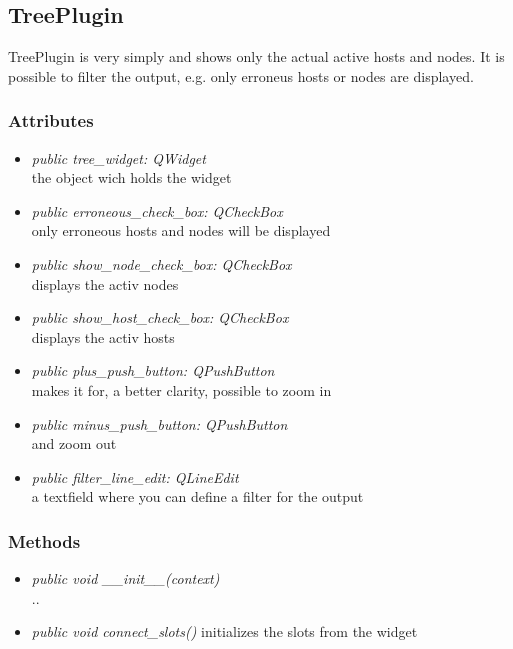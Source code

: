 \subsection{TreePlugin}
TreePlugin is very simply and shows only the actual active hosts
and nodes. It is possible to filter the output, e.g. only erroneus hosts or
nodes are displayed.
\subsubsection{Attributes}
\begin{itemize}
  \item \textit{public tree\_widget: QWidget}\\
  the object wich holds the widget
  \item \textit{public erroneous\_check\_box: QCheckBox}\\
  only erroneous hosts and nodes will be displayed
  \item \textit{public show\_node\_check\_box: QCheckBox}\\
  displays the activ nodes
  \item \textit{public show\_host\_check\_box: QCheckBox}\\
  displays the activ hosts
  \item \textit{public plus\_push\_button: QPushButton}\\
  makes it for, a better clarity, possible to zoom in  
  \item \textit{public minus\_push\_button: QPushButton}\\
  and zoom out
  \item \textit{public filter\_line\_edit: QLineEdit}\\
  a textfield where you can define a filter for the output
\end{itemize}
\subsubsection{Methods}
\begin{itemize}
  \item \textit{public void \_\_init\_\_(context)}\\
  ..
  \item \textit{public void connect\_slots()}
  initializes the slots from the widget
\end{itemize}

